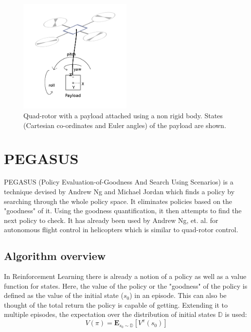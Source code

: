 \documentclass[hidelinks,BTech]{iitmdiss}
\begin{document}
\begin{figure}[H]
  \centering
    \includegraphics[width=0.5\textwidth]{payload.png}
    \caption{Quad-rotor with a payload attached using a non rigid body. States (Cartesian co-ordinates and Euler angles) of the payload are shown.}
\end{figure}


\chapter{PEGASUS}

PEGASUS \cite{PEGASUS} (Policy Evaluation-of-Goodness And Search Using Scenarios) is a technique devised by Andrew Ng and Michael Jordan which finds a policy by searching through the whole policy space. It eliminates policies based on the "goodness" of it. Using the goodness quantification, it then attempts to find the next policy to check. It has already been used by Andrew Ng, et. al. for autonomous flight control in helicopters \cite{HelicopterPegasus} which is similar to quad-rotor control.

\section{Algorithm overview}

In Reinforcement Learning there is already a notion of a policy as well as a value function for states. Here, the value of the policy or the "goodness" of the policy is defined as the value of the initial state ($s_{0}$) in an episode. This can also be thought of the total return the policy is capable of getting. Extending it to multiple episodes, the expectation over the distribution of initial states $\mathbb{D}$ is used:
\begin{equation}
  V(\pi) = \mathbf{E}_{s_{0} \sim \mathbb{D}} [ V^{\pi} (s_{0})]
\end{equation}
\end{document}
